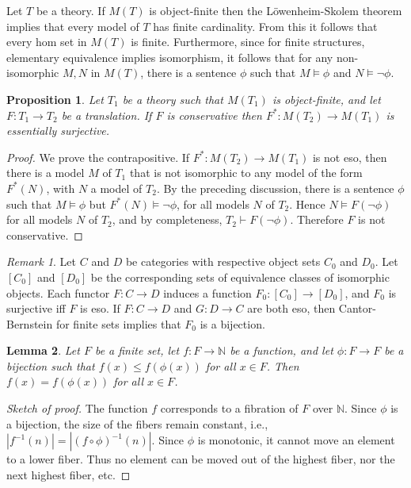 \documentclass[12pt]{article}
\newtheorem{prop}{Proposition}
\newtheorem{lemma}[prop]{Lemma}
\theoremstyle{definition}
\theoremstyle{remark}
\newtheorem*{note}{Remark}
\newcommand{\3}{\mathcal}
\begin{document}
Let $T$ be a theory. If $M(T)$ is object-finite then the
L{\"o}wenheim-Skolem theorem implies that every model of $T$ has
finite cardinality. From this it follows that every hom set in $M(T)$
is finite. Furthermore, since for finite structures, elementary
equivalence implies isomorphism, it follows that for any
non-isomorphic $M,N$ in $M(T)$, there is a sentence $\phi$ such that
$M\vDash\phi$ and $N\vDash\neg\phi$.

\begin{prop} Let $T_1$ be a theory such that $M(T_1)$ is
  object-finite, and let $F:T_1\to T_2$ be a translation. If $F$ is
  conservative then $F^*:M(T_2)\to M(T_1)$ is essentially
  surjective. \end{prop}

\begin{proof} We prove the contrapositive. If $F^*:M(T_2)\to M(T_1)$
  is not eso, then there is a model $M$ of $T_1$ that is not
  isomorphic to any model of the form $F^*(N)$, with $N$ a model of
  $T_2$. By the preceding discussion, there is a sentence $\phi$ such
  that $M\vDash \phi$ but $F^*(N)\vDash\neg \phi$, for all models $N$
  of $T_2$. Hence $N\vDash F(\neg \phi )$ for all models $N$ of $T_2$,
  and by completeness, $T_2\vdash F(\neg \phi )$. Therefore $F$ is not
  conservative. \end{proof}

\begin{note} Let $C$ and $D$ be categories with respective object sets
  $C_0$ and $D_0$. Let $[C_0]$ and $[D_0]$ be the corresponding sets
  of equivalence classes of isomorphic objects. Each functor
  $F:C\to D$ induces a function $F_0:[C_0]\to [D_0]$, and $F_0$ is
  surjective iff $F$ is eso. If $F:C\to D$ and $G:D\to C$ are both
  eso, then Cantor-Bernstein for finite sets implies that $F_0$ is a
  bijection. \end{note}

\begin{lemma} Let $F$ be a finite set, let $f:F\to\mathbb{N}$ be a
  function, and let $\phi :F\to F$ be a bijection such that
  $f(x)\leq f(\phi (x))$ for all $x\in F$. Then $f(x)=f(\phi (x))$ for
  all $x\in F$. \end{lemma}

\begin{proof}[Sketch of proof] The function $f$ corresponds to a
  fibration of $F$ over $\mathbb{N}$. Since $\phi$ is a bijection, the
  size of the fibers remain constant, i.e.,
  $|f^{-1}(n)|=|(f\circ \phi )^{-1}(n)|$. Since $\phi$ is monotonic,
  it cannot move an element to a lower fiber. Thus no element can be
  moved out of the highest fiber, nor the next highest fiber,
  etc. \end{proof}
\end{document}
